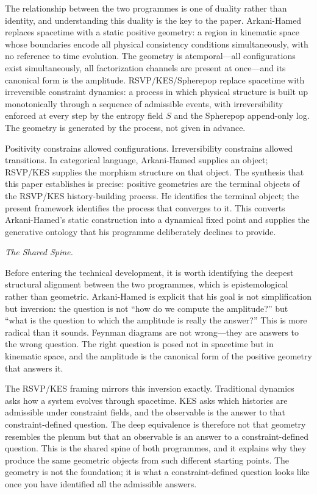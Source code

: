 \documentclass[11pt]{article}
\theoremstyle{plain}
\theoremstyle{definition}
\theoremstyle{remark}
\newcommand{\Sf}{S}
\begin{document}
The relationship between the two programmes is one of duality rather than identity, and understanding this duality is the key to the paper. Arkani-Hamed replaces spacetime with a static positive geometry: a region in kinematic space whose boundaries encode all physical consistency conditions simultaneously, with no reference to time evolution. The geometry is atemporal---all configurations exist simultaneously, all factorization channels are present at once---and its canonical form is the amplitude. RSVP/KES/Spherepop replace spacetime with irreversible constraint dynamics: a process in which physical structure is built up monotonically through a sequence of admissible events, with irreversibility enforced at every step by the entropy field $\Sf$ and the Spherepop append-only log. The geometry is generated by the process, not given in advance.

Positivity constrains allowed configurations. Irreversibility constrains allowed transitions. In categorical language, Arkani-Hamed supplies an object; RSVP/KES supplies the morphism structure on that object. The synthesis that this paper establishes is precise: positive geometries are the terminal objects of the RSVP/KES history-building process. He identifies the terminal object; the present framework identifies the process that converges to it. This converts Arkani-Hamed's static construction into a dynamical fixed point and supplies the generative ontology that his programme deliberately declines to provide.

\medskip\noindent\textit{The Shared Spine.}

Before entering the technical development, it is worth identifying the deepest structural alignment between the two programmes, which is epistemological rather than geometric. Arkani-Hamed is explicit that his goal is not simplification but inversion: the question is not ``how do we compute the amplitude?'' but ``what is the question to which the amplitude is really the answer?'' This is more radical than it sounds. Feynman diagrams are not wrong---they are answers to the wrong question. The right question is posed not in spacetime but in kinematic space, and the amplitude is the canonical form of the positive geometry that answers it.

The RSVP/KES framing mirrors this inversion exactly. Traditional dynamics asks how a system evolves through spacetime. KES asks which histories are admissible under constraint fields, and the observable is the answer to that constraint-defined question. The deep equivalence is therefore not that geometry resembles the plenum but that an observable is an answer to a constraint-defined question. This is the shared spine of both programmes, and it explains why they produce the same geometric objects from such different starting points. The geometry is not the foundation; it is what a constraint-defined question looks like once you have identified all the admissible answers.
\end{document}
